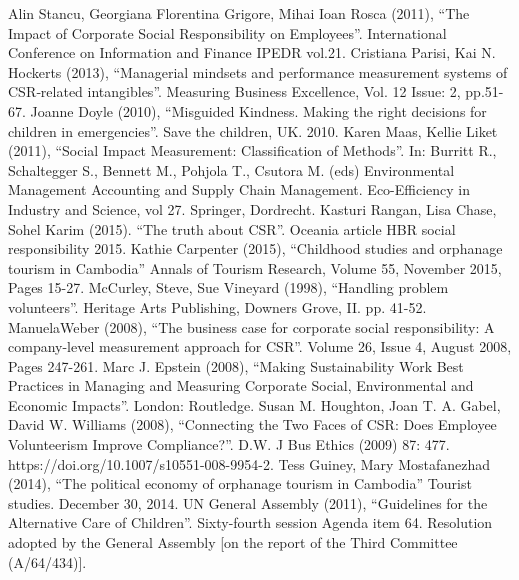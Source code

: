 \documentclass[conference]{IEEEtran}
\begin{document}
\begin{thebibliography}{00}
 Alin Stancu, Georgiana Florentina Grigore, Mihai Ioan Rosca (2011), ``The Impact of Corporate Social Responsibility on Employees''. International Conference on Information and Finance IPEDR vol.21.
 Cristiana Parisi, Kai N. Hockerts (2013), ``Managerial mindsets and performance measurement systems of CSR‐related intangibles''. Measuring Business Excellence, Vol. 12 Issue: 2, pp.51-67.
 Joanne Doyle (2010), ``Misguided Kindness. Making the right decisions for children in emergencies''. Save the children, UK. 2010.
  Karen Maas, Kellie Liket (2011), ``Social Impact Measurement: Classification of Methods''.  In: Burritt R., Schaltegger S., Bennett M., Pohjola T., Csutora M. (eds) Environmental Management Accounting and Supply Chain Management. Eco-Efficiency in Industry and Science, vol 27. Springer, Dordrecht.
 Kasturi Rangan, Lisa Chase, Sohel Karim (2015). ``The truth about CSR''. Oceania article HBR social responsibility 2015.
  Kathie Carpenter (2015), ``Childhood studies and orphanage tourism in Cambodia'' Annals of Tourism Research, Volume 55, November 2015, Pages 15-27.
 McCurley, Steve, Sue Vineyard (1998), ``Handling problem volunteers''. Heritage Arts Publishing, Downers Grove, II. pp. 41-52.
  ManuelaWeber (2008), ``The business case for corporate social responsibility: A company-level measurement approach for CSR''.  Volume 26, Issue 4, August 2008, Pages 247-261.
 Marc J. Epstein (2008), ``Making Sustainability Work Best Practices in Managing and Measuring Corporate Social, Environmental and Economic Impacts''.  London: Routledge.
 Susan M. Houghton, Joan T. A. Gabel, David W. Williams (2008), ``Connecting the Two Faces of CSR: Does Employee Volunteerism Improve Compliance?''. D.W. J Bus Ethics (2009) 87: 477. https://doi.org/10.1007/s10551-008-9954-2.
  Tess Guiney, Mary Mostafanezhad (2014), ``The political economy of orphanage tourism in Cambodia'' Tourist studies. December 30, 2014.
 UN General Assembly (2011), ``Guidelines for the Alternative Care of Children''. Sixty-fourth session Agenda item 64. Resolution adopted by the General Assembly [on the report of the Third Committee (A/64/434)].


\end{thebibliography}
\end{document}
